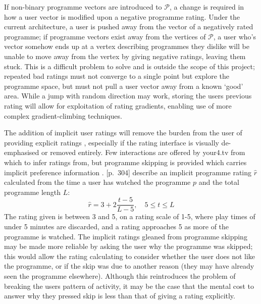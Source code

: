 		If non-binary programme vectors are introduced to $\mathcal{P}$, a change is required in how a user vector is modified upon a negative programme rating. Under the current architecture, a user is pushed away from the vector of a negatively rated programme; if programme vectors exist away from the vertices of $\mathcal{P}$, a user who's vector somehow ends up at a vertex describing programmes they dislike will be unable to move away from the vertex by giving negative ratings, leaving them stuck. This is a difficult problem to solve and is outside the scope of this project; repeated bad ratings must not converge to a single point but explore the programme space, but must not pull a user vector away from a known `good' area. While a jump with random direction may work, storing the users previous rating will allow for exploitation of rating gradients, enabling use of more complex gradient-climbing techniques.

		The addition of implicit user ratings will remove the burden from the user of providing explicit ratings \citep{implicit_indicators}, especially if the rating interface is visually de-emphasised or removed entirely. Few interactions are offered by your4.tv from which to infer ratings from, but programme skipping is provided which carries implicit preference information \cite{exploiting_implicit_feedback}. \citep{recommender-systems-handbook}[p.~304] describe an implicit programme rating $\hat{r}$ calculated from the time a user has watched the programme $p$ and the total programme length $L$:
		$$
			\hat{r} = 3 + 2 \frac{t - 5}{L - 5},\quad 5 \leq t \leq L
		$$
		The rating given is between 3 and 5, on a rating scale of 1-5, where play times of under 5 minutes are discarded, and a rating approaches 5 as more of the programme is watched. The implicit ratings gleaned from programme skipping may be made more reliable by asking the user why the programme was skipped; this would allow the rating calculating to consider whether the user does not like the programme, or if the skip was due to another reason (they may have already seen the programme elsewhere). Although this reintroduces the problem of breaking the users pattern of activity, it may be the case that the mental cost to answer why they pressed skip is less than that of giving a rating explicitly.

